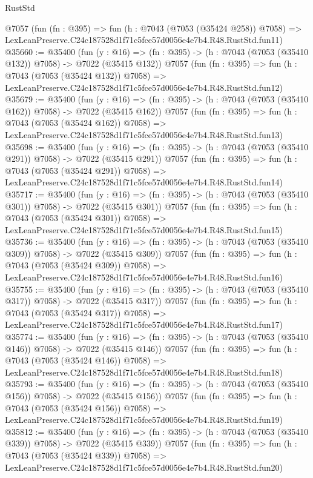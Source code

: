 \begin{lexlean}{RustStd}
\begin{coremodule}
    @7057
    (fun (fn : @395) =>
    fun (h : @7043 (@7053 (@35424 @258)) @7058) =>
    LexLeanPreserve.C24c187528d1f71c5fce57d0056e4e7b4.R48.RustStd.fun11)
@35660 := @35400
    (fun (y : @16) => (fn : @395) -> (h : @7043 (@7053 (@35410 @132)) @7058) -> @7022 (@35415 @132))
    @7057
    (fun (fn : @395) =>
    fun (h : @7043 (@7053 (@35424 @132)) @7058) =>
    LexLeanPreserve.C24c187528d1f71c5fce57d0056e4e7b4.R48.RustStd.fun12)
@35679 := @35400
    (fun (y : @16) => (fn : @395) -> (h : @7043 (@7053 (@35410 @162)) @7058) -> @7022 (@35415 @162))
    @7057
    (fun (fn : @395) =>
    fun (h : @7043 (@7053 (@35424 @162)) @7058) =>
    LexLeanPreserve.C24c187528d1f71c5fce57d0056e4e7b4.R48.RustStd.fun13)
@35698 := @35400
    (fun (y : @16) => (fn : @395) -> (h : @7043 (@7053 (@35410 @291)) @7058) -> @7022 (@35415 @291))
    @7057
    (fun (fn : @395) =>
    fun (h : @7043 (@7053 (@35424 @291)) @7058) =>
    LexLeanPreserve.C24c187528d1f71c5fce57d0056e4e7b4.R48.RustStd.fun14)
@35717 := @35400
    (fun (y : @16) => (fn : @395) -> (h : @7043 (@7053 (@35410 @301)) @7058) -> @7022 (@35415 @301))
    @7057
    (fun (fn : @395) =>
    fun (h : @7043 (@7053 (@35424 @301)) @7058) =>
    LexLeanPreserve.C24c187528d1f71c5fce57d0056e4e7b4.R48.RustStd.fun15)
@35736 := @35400
    (fun (y : @16) => (fn : @395) -> (h : @7043 (@7053 (@35410 @309)) @7058) -> @7022 (@35415 @309))
    @7057
    (fun (fn : @395) =>
    fun (h : @7043 (@7053 (@35424 @309)) @7058) =>
    LexLeanPreserve.C24c187528d1f71c5fce57d0056e4e7b4.R48.RustStd.fun16)
@35755 := @35400
    (fun (y : @16) => (fn : @395) -> (h : @7043 (@7053 (@35410 @317)) @7058) -> @7022 (@35415 @317))
    @7057
    (fun (fn : @395) =>
    fun (h : @7043 (@7053 (@35424 @317)) @7058) =>
    LexLeanPreserve.C24c187528d1f71c5fce57d0056e4e7b4.R48.RustStd.fun17)
@35774 := @35400
    (fun (y : @16) => (fn : @395) -> (h : @7043 (@7053 (@35410 @146)) @7058) -> @7022 (@35415 @146))
    @7057
    (fun (fn : @395) =>
    fun (h : @7043 (@7053 (@35424 @146)) @7058) =>
    LexLeanPreserve.C24c187528d1f71c5fce57d0056e4e7b4.R48.RustStd.fun18)
@35793 := @35400
    (fun (y : @16) => (fn : @395) -> (h : @7043 (@7053 (@35410 @156)) @7058) -> @7022 (@35415 @156))
    @7057
    (fun (fn : @395) =>
    fun (h : @7043 (@7053 (@35424 @156)) @7058) =>
    LexLeanPreserve.C24c187528d1f71c5fce57d0056e4e7b4.R48.RustStd.fun19)
@35812 := @35400
    (fun (y : @16) => (fn : @395) -> (h : @7043 (@7053 (@35410 @339)) @7058) -> @7022 (@35415 @339))
    @7057
    (fun (fn : @395) =>
    fun (h : @7043 (@7053 (@35424 @339)) @7058) =>
    LexLeanPreserve.C24c187528d1f71c5fce57d0056e4e7b4.R48.RustStd.fun20)

\end{coremodule}
\end{lexlean}
